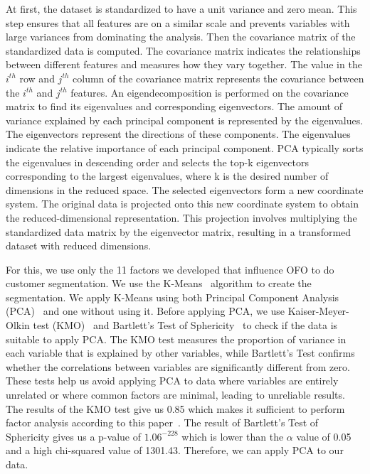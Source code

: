 \documentclass[a4paper,fleqn]{cas-sc}
\begin{document}
At first, the dataset is standardized to have a unit variance and zero mean. This step ensures that all features are on a similar scale and prevents variables with large variances from dominating the analysis. Then the covariance matrix of the standardized data is computed. The covariance matrix indicates the relationships between different features and measures how they vary together. The value in the $i^{th}$ row and $j^{th}$ column of the covariance matrix represents the covariance between the $i^{th}$ and $j^{th}$ features. An eigendecomposition is performed on the covariance matrix to find its eigenvalues and corresponding eigenvectors. The amount of variance explained by each principal component is represented by the eigenvalues. The eigenvectors represent the directions of these components. The eigenvalues indicate the relative importance of each principal component. PCA typically sorts the eigenvalues in descending order and selects the top-k eigenvectors corresponding to the largest eigenvalues, where k is the desired number of dimensions in the reduced space. The selected eigenvectors form a new coordinate system. The original data is projected onto this new coordinate system to obtain the reduced-dimensional representation. This projection involves multiplying the standardized data matrix by the eigenvector matrix, resulting in a transformed dataset with reduced dimensions. 

For this, we use only the 11 factors we developed that influence OFO to do customer segmentation. We use the K-Means~\cite{kmeans} algorithm to create the segmentation. We apply K-Means using both Principal Component Analysis (PCA)~\cite{Jolliffe2011} and one without using it. Before applying PCA, we use Kaiser-Meyer-Olkin test (KMO)~\cite{Kaiser1970} and Bartlett's Test of Sphericity~\cite{bartlett1950tests} to check if the data is suitable to apply PCA. The KMO test measures the proportion of variance in each variable that is explained by other variables, while Bartlett's Test confirms whether the correlations between variables are significantly different from zero. These tests help us avoid applying PCA to data where variables are entirely unrelated or where common factors are minimal, leading to unreliable results. The results of the KMO test give us 0.85 which makes it sufficient to perform factor analysis according to this paper~\cite{kmo}. The result of Bartlett's Test of Sphericity gives us a p-value of $1.06^{-228}$ which is lower than the $\alpha$ value of 0.05 and a high chi-squared value of 1301.43. Therefore, we can apply PCA to our data.
\end{document}
